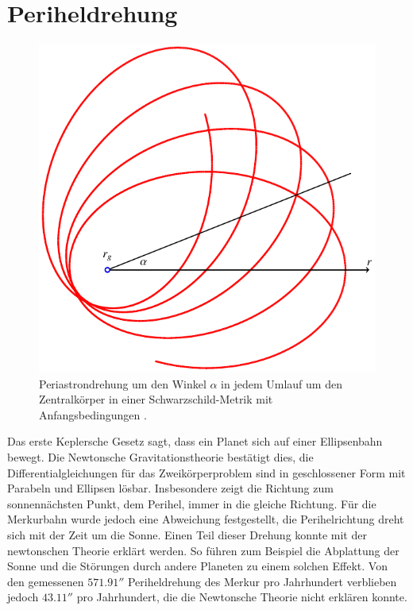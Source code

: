 %
%
%

\section{Periheldrehung%
\label{skript:chapters:s-perihel}}
\begin{figure}
\centering
\includegraphics{chapters/tikz/orbit.pdf}
\caption{Periastrondrehung um den Winkel $\alpha$ in jedem Umlauf um den
Zentralkörper in einer Schwarzschild-Metrik mit Anfangsbedingungen
\label{skript:schwarzschild:anfangsbedingung:normal}.
\label{skript:schwarzschild:perihelorbit}}
\end{figure}
Das erste Keplersche Gesetz sagt, dass ein Planet sich auf einer
Ellipsenbahn bewegt.
Die Newtonsche Gravitationstheorie bestätigt dies, die Differentialgleichungen
für das Zweikörperproblem sind in geschlossener Form
mit Parabeln und Ellipsen lösbar.
Insbesondere zeigt die Richtung zum sonnennächsten Punkt, dem Perihel,
immer in die gleiche Richtung.
Für die Merkurbahn wurde jedoch eine Abweichung festgestellt, die
Perihelrichtung dreht sich mit der Zeit um die Sonne.
Einen Teil dieser Drehung konnte mit der newtonschen Theorie erklärt werden.
So führen zum Beispiel die Abplattung der Sonne und die Störungen durch
andere Planeten zu einem solchen Effekt.
Von den gemessenen $571.91''$ Periheldrehung des Merkur pro Jahrhundert
verblieben jedoch $43.11''$ pro Jahrhundert, die die Newtonsche
Theorie nicht erklären konnte.

